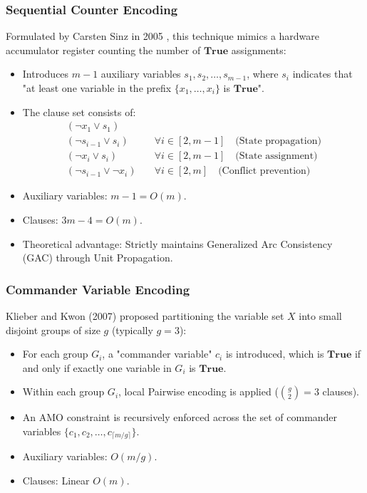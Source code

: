 \documentclass[a4paper,fleqn]{cas-sc}
\begin{document}
\subsubsection{Sequential Counter Encoding}
Formulated by Carsten Sinz in 2005 \cite{sinz2005towards}, this technique mimics a hardware accumulator register counting the number of $\mathbf{True}$ assignments:
\begin{itemize}
    \item Introduces $m-1$ auxiliary variables $s_1, s_2, \dots, s_{m-1}$, where $s_i$ indicates that "at least one variable in the prefix $\{x_1, \dots, x_i\}$ is $\mathbf{True}$".
    \item The clause set consists of:
    \begin{align}
    (\neg x_1 \lor s_1) & \\
    (\neg s_{i-1} \lor s_i) & \quad \forall i \in [2, m-1] \quad \text{(State propagation)} \\
    (\neg x_i \lor s_i) & \quad \forall i \in [2, m-1] \quad \text{(State assignment)} \\
    (\neg s_{i-1} \lor \neg x_i) & \quad \forall i \in [2, m] \quad \text{(Conflict prevention)}
    \end{align}
    \item Auxiliary variables: $m - 1 = O(m)$.
    \item Clauses: $3m - 4 = O(m)$.
    \item Theoretical advantage: Strictly maintains Generalized Arc Consistency (GAC) through Unit Propagation.
\end{itemize}

\subsubsection{Commander Variable Encoding}
Klieber and Kwon (2007) \cite{klieber2007commander} proposed partitioning the variable set $X$ into small disjoint groups of size $g$ (typically $g=3$):
\begin{itemize}
    \item For each group $G_i$, a "commander variable" $c_i$ is introduced, which is $\mathbf{True}$ if and only if exactly one variable in $G_i$ is $\mathbf{True}$.
    \item Within each group $G_i$, local Pairwise encoding is applied ($\binom{g}{2} = 3$ clauses).
    \item An AMO constraint is recursively enforced across the set of commander variables $\{c_1, c_2, \dots, c_{\lceil m/g \rceil}\}$.
    \item Auxiliary variables: $O(m/g)$.
    \item Clauses: Linear $O(m)$.
\end{itemize}
\end{document}

